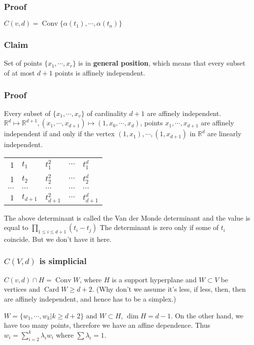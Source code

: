 \documentclass[11pt]{article}
\def\R{\mathbb{R}}
\def\conv{\operatorname{Conv}}
\def\card{\operatorname{Card}}
\begin{document}
{{\subsubsection{Proof}
\label{sec:org38a26bd}
\(C(v, d) = \conv\{\alpha(t_1), \cdots, \alpha(t_n)\}\)
\subsubsection{Claim}
\label{sec:org9d499eb}
Set of points \(\{x_1, \cdots, x_r\}\) is in \textbf{general position}, which means
that every subset of at most \(d+1\) points is affinely independent.
\subsubsection{Proof}
\label{sec:org45ee101}
Every subset of \(\{x_1, \cdots, x_v\}\) of cardinality \(d+1\) are affinely
independent. \(\R^d \mapsto \R^{d+1}, (x_1, \cdots, x_{d+1}) \mapsto (1, x_0,
    \cdots, x_d)\), points \(x_1, \cdots, x_{d+1}\) are affinely independent if and
only if the vertex \((1, x_1), \cdots, (1, x_{d+1})\) in \(\R^d\) are linearly
independent.

\begin{center}
\begin{tabular}{rllll}
1 & \(t_1\) & \(t_1^2\) & \(\cdots\) & \(t_1^d\)\\
1 & \(t_2\) & \(t_2^2\) & \(\cdots\) & \(t_2^d\)\\
\(\cdots\) & \(\cdots\) & \(\cdots\) & \(\cdots\) & \(\cdots\)\\
\(1\) & \(t_{d+1}\) & \(t_{d+1}^2\) & \(\cdots\) & \(t_{d+1}^{d}\)\\
\end{tabular}
\end{center}

The above determinant is called the Van der Monde determinant and the value
is equal to \(\prod_{1 \le i \le d+1} (t_i - t_j)\) The determinant is zero
only if some of \(t_i\) coincide. But we don't have it here.
\subsubsection{\(C(V, d)\) is simplicial}
\label{sec:org919fa4e}
\(C(v, d) \cap H = \conv W\), where \(H\) is a support hyperplane and \(W \subset
    V\) be vertices and \(\card W \ge d+2\). (Why don't we assume it's less, if
less, then, then are affinely independent, and hence has to be a simplex.)

\(W = \{w_1, \cdots, w_k \vert k \ge d+2\}\) and \(W \subset H\), \(\dim H =
    d-1\). On the other hand, we have too many points, therefore we have an
affine dependence. Thus \(w_i = \sum_{i = 2}^{k} \lambda_i w_i\) where
\(\sum \lambda_i =1\).

}}
\end{document}
